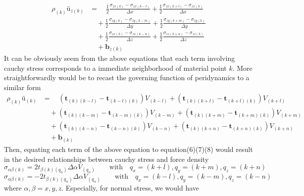 \documentclass[a4paper,11pt,CJK]{paper}
\newcommand{\bft}{\textbf{t}}
\begin{document}
\begin{equation}
\begin{aligned}
\rho_{(k)}\textbf{\"u}_{z(k)} &= \quad \frac{1}{2}\frac{\sigma_{zx(k)} - \sigma_{zx(k-l)}}{\Delta x} + \frac{1}{2}\frac{\sigma_{zx(k+l)} - \sigma_{zx(k)}}{\Delta x}\\
                              &\quad+  \frac{1}{2}\frac{\sigma_{zy(k)} - \sigma_{zy(k-m)}}{\Delta y} + \frac{1}{2}\frac{\sigma_{zy(k+m)} - \sigma_{zy(k)}}{\Delta y}\\
                              &\quad+  \frac{1}{2}\frac{\sigma_{zx(k)} - \sigma_{zx(k-n)}}{\Delta z} + \frac{1}{2}\frac{\sigma_{zz(k+n)} - \sigma_{zz(k)}}{\Delta z}\\
                              &\quad + \textbf{b}_{z(k)}
\end{aligned}
\end{equation}
It can be obviously seem from the above equations that each term involving cauchy stress corresponds to a immediate neighborhood of material point $k$.
More straightforwardly would be to recast the governing function of peridynamics to a similar form
\begin{equation}
\begin{aligned}
\rho_{(k)}\textbf{\"u}_{(k)} &= \quad (\bft_{(k)(k-l)} - \bft_{(k-l)(k)})V_{(k-l)} + (\bft_{(k)(k+l)} - \bft_{(k+l)(k)})V_{(k+l)}\\
                             &\quad + (\bft_{(k)(k-m)} - \bft_{(k-m)(k)})V_{(k-m)} + (\bft_{(k)(k+m)} - \bft_{(k+m)(k)})V_{(k+m)}\\
                             &\quad + (\bft_{(k)(k-n)} - \bft_{(k-n)(k)})V_{(k-n)} + (\bft_{(k)(k+n)} - \bft_{(k+n)(k)})V_{(k+n)}\\
                             &\quad  + \textbf{b}_{(k)}
\end{aligned}
\end{equation}
Then, equating each term of the above equation to equation(6)(7)(8) would result in the desired relationships between cauchy stress and force density 
\begin{equation}
\sigma_{\alpha\beta(k)} = 2t_{\beta(k)(q_\alpha)}\Delta\alpha V_{(q_\alpha)}\qquad \mathrm{with } \quad q_x=(k+l),q_y=(k+m),q_z=(k+n)
\end{equation}
\begin{equation}
\sigma_{\alpha\beta(k)} = -2t_{\beta(k)(q_\alpha)}\Delta\alpha V_{(q_\alpha)}\qquad \mathrm{with } \quad q_x=(k-l),q_y=(k-m),q_z=(k-n)
\end{equation}
where $\alpha,\beta=x,y,z$. Especially, for normal stress, we would have
\end{document}
